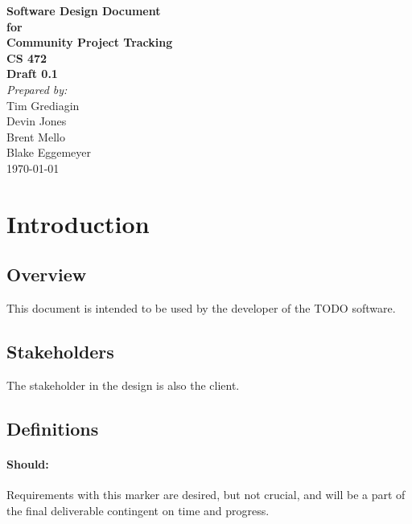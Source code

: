 \documentclass[12pt]{article}
\begin{document}
\begin{titlepage}
\begin{flushright} 
{\LARGE \bfseries Software Design Document}\\[1.2cm]
{\large \bfseries for}\\[1.2cm]
{\huge \bfseries Community Project Tracking}\\[1.2cm]
{\large \bfseries CS 472}\\
\vfill
{\large \bfseries Draft 0.1}\\[2cm]
\emph{Prepared by:} \\
Tim Grediagin\\
Devin Jones\\
Brent Mello\\
Blake Eggemeyer \\ [3cm]
{\large \today}
\end{flushright}
\end{titlepage}
\setcounter{tocdepth}{3}
\setcounter{secnumdepth}{5}
\tableofcontents
\newpage

\section{Introduction}

\subsection{Overview}
This document is intended to be used by the developer of the TODO software.

\subsection{Stakeholders}
The stakeholder in the design is also the client.

\subsection{Definitions}
\setcounter{paragraph}{0}
\setcounter{subsubsection}{0}
\paragraph{Should:} Requirements with this marker are desired, but not crucial, and will be a part of the final deliverable contingent on time and progress.
\end{document}
